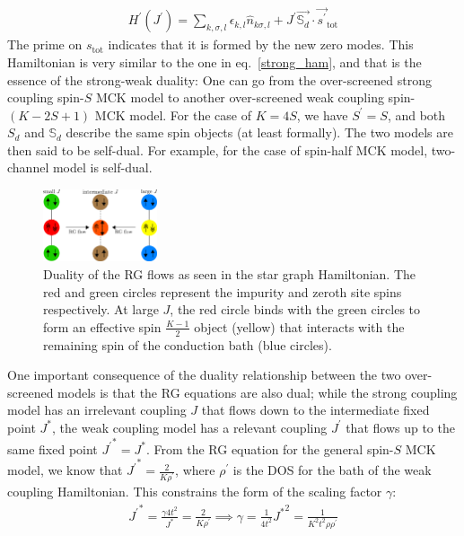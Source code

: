 \documentclass[reprint,prb,superscriptaddress]{revtex4-2}
\begin{document}
\begin{equation}\begin{aligned}
	H^\prime(J^\prime) = \sum_{k,\sigma,l}\epsilon_{k,l} \hat n_{k\sigma,l} + J^\prime \vec{\mathbb{S}_d}\cdot\vec{s^\prime}_\text{tot}
\end{aligned}\end{equation}
The prime on \(s_\text{tot}\) indicates that it is formed by the new zero modes. This Hamiltonian is very similar to the one in eq.~\ref{strong_ham}, and that is the essence of the strong-weak duality: One can go from the over-screened strong coupling spin-\(S\) MCK model to another over-screened weak coupling spin-\((K-2S+1)\) MCK model. For the case of \(K=4S\), we have \(S^\prime = S\), and both \(S_d\) and \(\mathbb{S}_d\) describe the same spin objects (at least formally). The two models are then said to be self-dual. For example, for the case of spin-half MCK model, two-channel model is self-dual.
\begin{figure}[!htpb]
	\centering
	\includegraphics[width=0.3\textwidth]{plt/duality.pdf}
	\caption{Duality of the RG flows as seen in the star graph Hamiltonian. The red and green circles represent the impurity and zeroth site spins respectively. At large \(J\), the red circle binds with the green circles to form an effective spin \(\frac{K-1}{2}\) object (yellow) that interacts with the remaining spin of the conduction bath (blue circles).}
	\label{duality_fig}
\end{figure}

One important consequence of the duality relationship between the two over-screened models is that the RG equations are also dual; while the strong coupling model has an irrelevant coupling \(J\) that flows down to the intermediate fixed point \(J^*\), the weak coupling model has a relevant coupling \(J^\prime\) that flows up to the same fixed point \({J^\prime}^* = J^*\). From the RG equation for the general spin-\(S\) MCK model, we know that \({J^\prime}^* = \frac{2}{K \rho^\prime}\), where \(\rho^\prime\) is the DOS for the bath of the weak coupling Hamiltonian. This constrains the form of the scaling factor \(\gamma\):
\begin{equation}\begin{aligned}
	{J^\prime}^* = \frac{\gamma 4t^2}{J^*} = \frac{2}{K \rho^\prime} \implies \gamma = \frac{1}{4t^2} {J^*}^2 = \frac{1}{K^2 t^2 \rho \rho^\prime}
\end{aligned}\end{equation}
\end{document}
